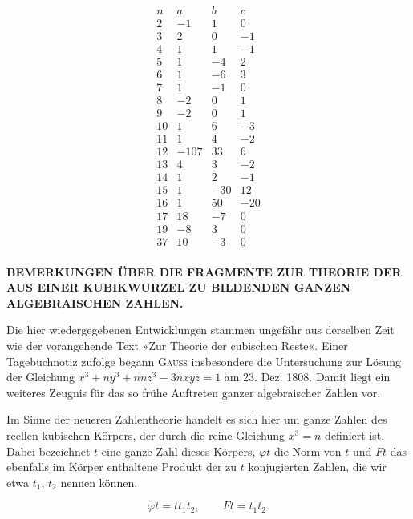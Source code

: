 \[
\begin{array}{r|rrr}
n & a & b & c \\
\hline
2 & -1 & 1 & 0 \\
3 & 2 & 0 & -1 \\
4 & 1 & 1 & -1 \\
5 & 1 & -4 & 2 \\
6 & 1 & -6 & 3 \\
7 & 1 & -1 & 0 \\
8 & -2 & 0 & 1 \\
9 & -2 & 0 & 1 \\
10 & 1 & 6 & -3 \\
11 & 1 & 4 & -2 \\
12 & -107 & 33 & 6 \\
13 & 4 & 3 & -2 \\
14 & 1 & 2 & -1 \\
15 & 1 & -30 & 12 \\
16 & 1 & 50 & -20 \\
17 & 18 & -7 & 0 \\
19 & -8 & 3 & 0 \\
37 & 10 & -3 & 0 \\
\end{array}
\]

\begingroup\small

\begin{center}\textbf{BEMERKUNGEN ÜBER DIE FRAGMENTE ZUR THEORIE DER AUS EINER KUBIKWURZEL
ZU BILDENDEN GANZEN ALGEBRAISCHEN ZAHLEN.}\end{center}\par\noindent\hspace*{\parindent}Die hier wiedergegebenen Entwicklungen stammen ungefähr aus derselben Zeit wie
der vorangehende Text »Zur Theorie der cubischen Reste«. Einer
Tagebuchnotiz zufolge begann \textsc{Gauss} insbesondere die Untersuchung zur Lösung der
Gleichung $x^3+ny^3+nnz^3-3nxyz=1$ am 23. Dez. 1808. Damit liegt
ein weiteres Zeugnis für das so frühe Auftreten ganzer algebraischer
Zahlen vor.

Im Sinne der neueren Zahlentheorie handelt es sich hier um ganze Zahlen
des reellen kubischen Körpers, der durch die reine Gleichung $x^3=n$
definiert ist. Dabei bezeichnet $t$ eine ganze Zahl dieses Körpers, $\varphi t$ die
Norm von $t$ und $Ft$ das ebenfalls im Körper enthaltene Produkt der zu
$t$ konjugierten Zahlen, die wir etwa $t_1$, $t_2$ nennen können.

\[
\varphi t = t t_1 t_2, \qquad Ft = t_1 t_2.
\]
